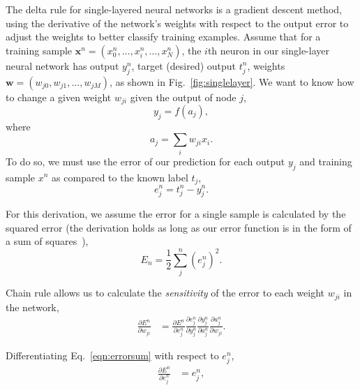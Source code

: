\documentclass[thesis]{subfiles}
\begin{document}
The delta rule for single-layered neural networks is a gradient descent method, using the derivative of the network's weights with respect to the output error to adjust the weights to better classify training examples. Assume that for a training sample $\mathbf{x}^n = (x^n_0, \ldots, x^n_i, \ldots, x^n_N)$, the $i$th neuron in our single-layer neural network has output $y^n_j$, target (desired) output $t^n_j$, weights $\mathbf{w}=(w_{j0}, w_{j1}, \ldots, w_{jM})$, as shown in Fig.~\ref{fig:singlelayer}. We want to know how to change a given weight $w_{ji}$ given the output of node $j$, 
\begin{equation}
	y_j = f\left( a_j \right),
	\label{eqn:output}
\end{equation}
where
\begin{equation}
	a_j = \sum_i w_{ji} x_{i}.
	\label{eqn:weightsum}
\end{equation}
To do so, we must use the error of our prediction for each output $y_j$ and training sample $x^n$ as compared to the known label $t_j$,
\begin{equation}
    e^n_j = t^n_j - y^n_j.
    \label{eqn:error}
\end{equation}

For this derivation, we assume the error for a single sample is calculated by the squared error (the derivation holds as long as our error function is in the form of a sum of squares~\citep{Bishop1995}),
\begin{equation}
    E_n = \frac{1}{2} \sum^n_j \left(e^n_j\right)^2.
    \label{eqn:errorsum}
\end{equation}

Chain rule allows us to calculate the \emph{sensitivity} of the error to each weight $w_{ji}$ in the network,
\begin{equation}
\begin{aligned}
    \frac{\partial E^n}{\partial w_{ji}} &= \frac{\partial E^n}{\partial e^n_j}\frac{\partial e^n_j}{\partial y^n_j} \frac{\partial y^n_j}{\partial a^n_j} \frac{\partial a^n_j}{\partial w_{ji}}.
\end{aligned}
\end{equation}

Differentiating Eq.~\ref{eqn:errorsum} with respect to $e^n_j$,
\begin{equation}
\begin{aligned}
    \frac{\partial E^n}{\partial e^n_j} &= e^n_j,
\end{aligned}
\end{equation}
\end{document}
